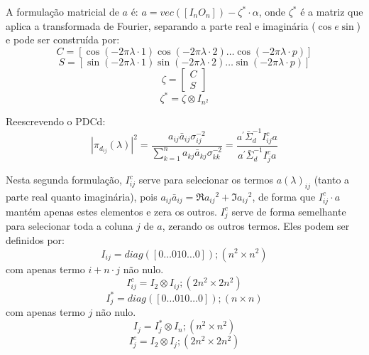 \documentclass[a4paper,10pt]{article}
\begin{document}
A formulação matricial de $a$ é:
$a = vec(\left[ I_{n} O_{n} \right]) - \zeta^{\ast} \cdot \alpha$, onde $\zeta^{\ast}$ é a matriz que aplica a transformada de Fourier, separando a parte real e imaginária ($\cos e \sin$) e pode ser construída por:
\begin{equation}
C = [\cos(-2\pi\lambda \cdot 1) \cos(-2\pi\lambda \cdot 2) \dots \cos(-2\pi\lambda \cdot p)]
\end{equation}
\begin{equation}
S = \left[\sin(-2\pi\lambda \cdot 1) \sin(-2\pi\lambda \cdot 2) \dots \sin(-2\pi\lambda \cdot p)\right]
\end{equation}
\begin{equation}
\zeta = \left[\begin{array}{c} C \\ S \end{array} \right]
\end{equation}
\begin{equation}
\zeta^{\ast} = \zeta \otimes I_{n^{2}}
\end{equation}

Reescrevendo o PDCd:
\begin{equation} 
|\pi_{d_{ij}}(\lambda)|^{2} = \frac{a_{ij} \bar{a}_{ij} \sigma_{ij}^{-2}} {\sum_{k=1}^{n}{a_{kj} \bar{a}_{kj} \sigma_{kk}^{-2}}} = \frac{a^{'} \bar{\Sigma}_{d}^{-1} I_{ij}^{c} a}{a^{'} \bar{\Sigma}_{d}^{-1} I_{j}^{c} a}
\end{equation}

Nesta segunda formulação, $I_{ij}^{c}$ serve para selecionar os termos $a(\lambda)_{ij}$ (tanto a parte real quanto imaginária), pois $a_{ij} \bar {a}_{ij} = \Re{a_{ij}}^2 + \Im{a_{ij}}^2$, de forma que $I_{ij}^{c} \cdot a$ mantém apenas estes elementos e zera os outros. $I_{j}^{c}$ serve de forma semelhante para selecionar toda a coluna $j$ de $a$, zerando os outros termos. Eles podem ser definidos por:
\begin{equation}
I_{ij} = diag(\left[ 0 \dots 0 1 0 \dots 0 \right]); (n^{2} \times n^{2})
\end{equation} 
com apenas termo $i+n\cdot j$ não nulo.
\begin{equation}
I_{ij}^{c} = I_{2} \otimes I_{ij}; (2n^{2} \times 2n^{2}) 
\end{equation}
\begin{equation}
I_{j}^{\ast} = diag([0 \dots 0 1 0 \dots 0]); (n \times n)
\end{equation}
com apenas termo $j$ não nulo.
\begin{equation}
I_{j} = I_{j}^{\ast} \otimes I_{n}; (n^{2} \times n^{2})
\end{equation}
\begin{equation}
I_{j}^{c} = I_{2} \otimes I_{j}; (2n^{2} \times 2n^{2})
\end{equation}
\end{document}
